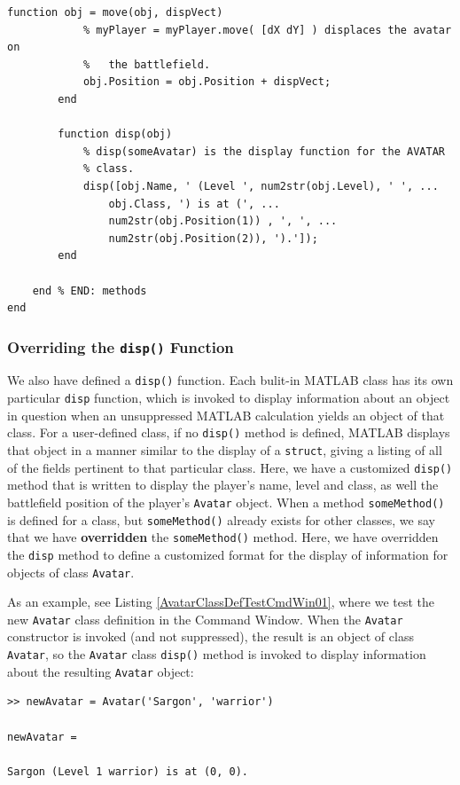 \begin{lstlisting}[style=Matlab-editor, label=AvatarClassDef0, caption={An initial class definition file for the \texttt{Avatar} class.}]
        function obj = move(obj, dispVect)
            % myPlayer = myPlayer.move( [dX dY] ) displaces the avatar on
            %   the battlefield.
            obj.Position = obj.Position + dispVect;
        end
        
        function disp(obj)
            % disp(someAvatar) is the display function for the AVATAR
            % class.
            disp([obj.Name, ' (Level ', num2str(obj.Level), ' ', ...
                obj.Class, ') is at (', ...
                num2str(obj.Position(1)) , ', ', ...
                num2str(obj.Position(2)), ').']);
        end
        
    end % END: methods
end
\end{lstlisting}

\subsubsection{Overriding the \texttt{disp()} Function}
We also have defined a \texttt{disp()} function. Each bulit-in MATLAB class has its own particular \texttt{disp} function, which is invoked to display information about an object in question when an unsuppressed MATLAB calculation yields an object of that class. For a user-defined class, if no \texttt{disp()} method is defined, MATLAB displays that object in a manner similar to the display of a \texttt{struct}, giving a listing of all of the fields pertinent to that particular class. Here, we have a customized \texttt{disp()} method that is written to display the player's name, level and class, as well the battlefield position of the player's \texttt{Avatar} object. When a method \texttt{someMethod()} is defined for a class, but \texttt{someMethod()} already exists for other classes, we say that we have \textbf{overridden} the \texttt{someMethod()} method. Here, we have overridden the \texttt{disp} method to define a customized format for the display of information for objects of class \texttt{Avatar}.

As an example, see Listing \ref{AvatarClassDefTestCmdWin01}, where we test the new \texttt{Avatar} class definition in the Command Window. When the \texttt{Avatar} constructor is invoked (and not suppressed), the result is an object of class \texttt{Avatar}, so the \texttt{Avatar} class \texttt{disp()} method is invoked to display information about the resulting \texttt{Avatar} object:
\begin{lstlisting}[style=Matlab-editor, label=AvatarClassDefTestCmdWin01, caption={Command Window input and output to test the \texttt{Avatar} class constructor and overridden \texttt{disp()} method.}]
>> newAvatar = Avatar('Sargon', 'warrior')

newAvatar = 

Sargon (Level 1 warrior) is at (0, 0).
\end{lstlisting}

